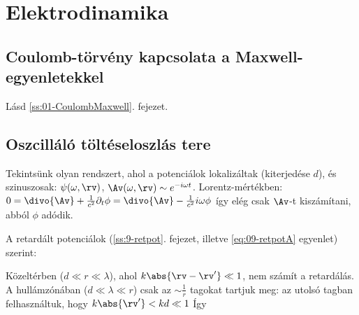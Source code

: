  \section{Elektrodinamika} 
  
  \subsection{Coulomb-törvény kapcsolata a Maxwell-egyenletekkel}
   
   Lásd \ref{ss:01-CoulombMaxwell}. fejezet.
   
  \subsection{Oszcilláló töltéseloszlás tere}\label{ss:13-oszcillaloter}
   
   Tekintsünk olyan rendszert, ahol a potenciálok lokalizáltak (kiterjedése $d$), és szinuszosak: $\psi(\omega,\rv)$, $\Av(\omega,\rv)\sim e^{-i\omega t}$.
   Lorentz-mértékben: $0=\divo{\Av}+\frac{1}{c^2}\partial_t\phi=\divo{\Av}-\frac{1}{c^2}i\omega\phi$ így elég csak $\Av$-t kiszámítani, abból $\phi$ adódik.
   
   A retardált potenciálok (\ref{ss:9-retpot}. fejezet, illetve \eqref{eq:09-retpotA} egyenlet) szerint:
   
   Közeltérben ($d\ll r\ll\lambda$), ahol $k\abs{\rv-\rv'}\ll 1$, nem számít a retardálás.
   A hullámzónában ($d\ll\lambda\ll r $) csak az $\sim\frac{1}{r}$ tagokat tartjuk meg:
   az utolsó tagban felhasználtuk, hogy $k\abs{\rv'}<kd\ll 1$
   Így
    

